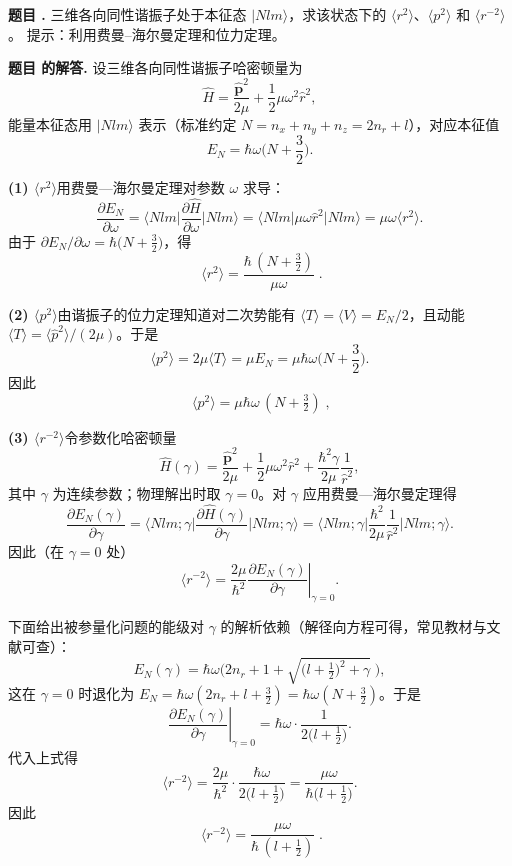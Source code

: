 \documentclass[12pt, a4paper, oneside]{ctexart}
\newcounter{problemname}
\newenvironment{problem}
  {\begin{shaded}\stepcounter{problemname}\par\noindent\textbf{题目 \theproblemname. }}
  {\end{shaded}\par}
\newenvironment{solution}
  {\par\noindent\textbf{题目 \theproblemname 的解答. }}
  {\par}
\begin{document}
\begin{problem}
  三维各向同性谐振子处于本征态 $\lvert Nlm\rangle$，求该状态下的 
$\langle r^2\rangle$、$\langle p^2\rangle$ 和 $\langle r^{-2}\rangle$。
提示：利用费曼–海尔曼定理和位力定理。
\end{problem}

\begin{solution}
  设三维各向同性谐振子哈密顿量为
\[
\hat H=\frac{\hat{\boldsymbol p}^2}{2\mu}+\frac{1}{2}\mu\omega^2\hat r^2,
\]
能量本征态用 $\lvert Nlm\rangle$ 表示（标准约定 $N=n_x+n_y+n_z=2n_r+l$），对应本征值
\[
E_{N}=\hbar\omega\Big(N+\frac{3}{2}\Big).
\]

\textbf{(1) \(\langle r^2\rangle\)}\quad 用费曼—海尔曼定理对参数 \(\omega\) 求导：
\[
\frac{\partial E_N}{\partial\omega}
=\Big\langle Nlm\Big|\frac{\partial\hat H}{\partial\omega}\Big|Nlm\Big\rangle
=\Big\langle Nlm\big|\mu\omega\hat r^2\big|Nlm\Big\rangle
=\mu\omega\langle r^2\rangle.
\]
由于 \(\partial E_N/\partial\omega=\hbar\big(N+\tfrac32\big)\)，得
\[
\boxed{\;\langle r^2\rangle=\frac{\hbar\,(N+\tfrac32)}{\mu\omega}\;}.
\]

\bigskip

\textbf{(2) \(\langle p^2\rangle\)}\quad 由谐振子的位力定理知道对二次势能有
\(\langle T\rangle=\langle V\rangle=E_N/2\)，且动能 \(\langle T\rangle=\langle \hat p^2\rangle/(2\mu)\)。于是
\[
\langle p^2\rangle=2\mu\langle T\rangle=\mu E_N
=\mu\hbar\omega\Big(N+\frac32\Big).
\]
因此
\[
\boxed{\;\langle p^2\rangle=\mu\hbar\omega\,(N+\tfrac32)\;},
\]


\bigskip

\textbf{(3) \(\langle r^{-2}\rangle\)}\quad 令参数化哈密顿量
\[
\hat H(\gamma)=\frac{\hat{\boldsymbol p}^2}{2\mu}+\frac{1}{2}\mu\omega^2\hat r^2
+\frac{\hbar^2\gamma}{2\mu}\frac{1}{\hat r^2},
\]
其中 \(\gamma\) 为连续参数；物理解出时取 \(\gamma=0\)。对 \(\gamma\) 应用费曼—海尔曼定理得
\[
\frac{\partial E_N(\gamma)}{\partial\gamma}
=\Big\langle Nlm;\gamma\Big|\frac{\partial\hat H(\gamma)}{\partial\gamma}\Big|Nlm;\gamma\Big\rangle
=\Big\langle Nlm;\gamma\Big|\frac{\hbar^2}{2\mu}\frac{1}{\hat r^2}\Big|Nlm;\gamma\Big\rangle.
\]
因此（在 \(\gamma=0\) 处）
\[
\langle r^{-2}\rangle=\frac{2\mu}{\hbar^2}\left.\frac{\partial E_N(\gamma)}{\partial\gamma}\right|_{\gamma=0}.
\]

下面给出被参量化问题的能级对 \(\gamma\) 的解析依赖（解径向方程可得，常见教材与文献可查）：
\[
E_N(\gamma)=\hbar\omega\Big(2n_r+1+\sqrt{\Big(l+\tfrac12\Big)^2+\gamma}\;\Big),
\]
这在 \(\gamma=0\) 时退化为 \(E_N=\hbar\omega(2n_r+l+\tfrac32)=\hbar\omega(N+\tfrac32)\)。于是
\[
\left.\frac{\partial E_N(\gamma)}{\partial\gamma}\right|_{\gamma=0}
=\hbar\omega\cdot\frac{1}{2\big(l+\tfrac12\big)}.
\]
代入上式得
\[
\langle r^{-2}\rangle=\frac{2\mu}{\hbar^2}\cdot\frac{\hbar\omega}{2\big(l+\tfrac12\big)}
=\frac{\mu\omega}{\hbar\big(l+\tfrac12\big)}.
\]
因此
\[
\boxed{\;\langle r^{-2}\rangle=\frac{\mu\omega}{\hbar\,(l+\tfrac12)}\; }.
\]
\end{solution}
\end{document}
